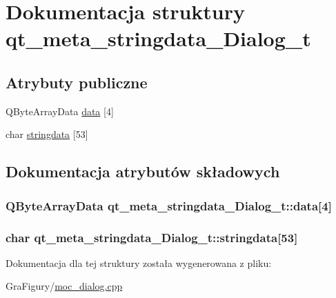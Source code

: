 \hypertarget{structqt__meta__stringdata__Dialog__t}{\section{Dokumentacja struktury qt\-\_\-meta\-\_\-stringdata\-\_\-\-Dialog\-\_\-t}
\label{structqt__meta__stringdata__Dialog__t}
}
\subsection*{Atrybuty publiczne}
\begin{DoxyCompactItemize}
\item 
Q\-Byte\-Array\-Data \hyperlink{structqt__meta__stringdata__Dialog__t_ab25b68005835d5ad3d70c1bca9c726c2}{data} \mbox{[}4\mbox{]}
\item 
char \hyperlink{structqt__meta__stringdata__Dialog__t_ad6163da7425da4b675c485bda71f5f5f}{stringdata} \mbox{[}53\mbox{]}
\end{DoxyCompactItemize}


\subsection{Dokumentacja atrybutów składowych}
\hypertarget{structqt__meta__stringdata__Dialog__t_ab25b68005835d5ad3d70c1bca9c726c2}{
\subsubsection[{data}]{\setlength{\rightskip}{0pt plus 5cm}Q\-Byte\-Array\-Data qt\-\_\-meta\-\_\-stringdata\-\_\-\-Dialog\-\_\-t\-::data\mbox{[}4\mbox{]}}}\label{structqt__meta__stringdata__Dialog__t_ab25b68005835d5ad3d70c1bca9c726c2}
\hypertarget{structqt__meta__stringdata__Dialog__t_ad6163da7425da4b675c485bda71f5f5f}{
\subsubsection[{stringdata}]{\setlength{\rightskip}{0pt plus 5cm}char qt\-\_\-meta\-\_\-stringdata\-\_\-\-Dialog\-\_\-t\-::stringdata\mbox{[}53\mbox{]}}}\label{structqt__meta__stringdata__Dialog__t_ad6163da7425da4b675c485bda71f5f5f}


Dokumentacja dla tej struktury została wygenerowana z pliku\-:\begin{DoxyCompactItemize}
\item 
Gra\-Figury/\hyperlink{moc__dialog_8cpp}{moc\-\_\-dialog.\-cpp}\end{DoxyCompactItemize}
